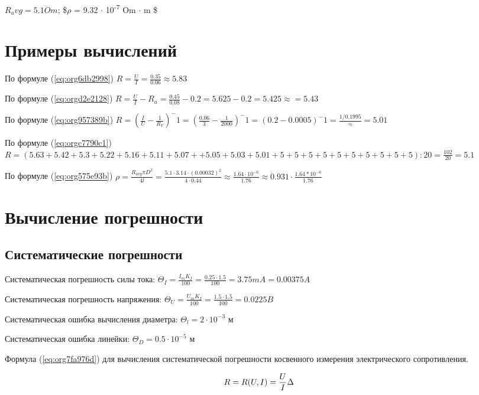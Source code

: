 \documentclass[14pt]{extarticle}
\begin{document}
\(R_avg = 5.1 Om\); \$\(\rho\) = 9.32 \(\cdot\) 10\textsuperscript{-7} Om \(\cdot\) m \$


\section{Примеры вычислений}
\label{sec:orgd89b211}

По формуле (\ref{eq:org6db2998}) \(R = \frac{U}{I} = \frac{0.35}{0.06} \approx 5.83\)

По формуле (\ref{eq:orgd2e2128}) \(R = \frac{U}{I} - R_a = \frac{0.45}{0.08} - 0.2 = 5.625 - 0.2 = 5.425 \approx = 5.43\)

По формуле (\ref{eq:org957389b}) \(R = (\frac{I}{U} - \frac{1}{R_V})^-1 = (\frac{0.06}{3} - \frac{1}{2000})^-1  = (0.2 - 0.0005)^-1 = \frac{1/0.1995} \approx = 5.01\)

По формуле (\ref{eq:orgc7790c1}) \(R = (5.63+5.42+5.3+5.22+5.16+5.11+5.07 + + 5.05+5.03+5.01+5+5+5+5+5+5+5+5+5+5) : 20 = \frac{102}{20} = 5.1\)

По формуле (\ref{eq:org575e93b}) \(\rho = \frac{R_{avg} \pi D^2}{4l} = \frac{5.1 \cdot 3.14 \cdot (0.00032)^2}{4 \cdot 0.44} \approx \frac{1.64 \cdot 10^{-6}}{1.76} \approx 0.931 \cdot \frac{1.64 * 10^{-6}}{1.76}\)


\section{Вычисление погрешности}
\label{sec:org918c2d1}

\subsection{Систематические погрешности}
\label{sec:org03ecdab}

Систематическая погрешность силы тока: \(\Theta_I = \frac{I_m K_I}{100} = \frac{0.25 \cdot 1.5}{100} = 3.75 mA = 0.00375 A\)

Систематическая погрешность напряжения: \(\Theta_U = \frac{U_m K_I}{100} = \frac{1.5 \cdot 1.5}{100} = 0.0225 B\)

Систематическая ошибка вычисления диаметра: \(\Theta_l = 2 \cdot 10^{-3}\) м

Систематическая ошибка линейки: \(\Theta_D = 0.5 \cdot 10^{-5}\) м

Формула (\ref{eq:org7fa976d}) для вычисления систематической погрешности косвенного измерения электрического
сопротивления.

\begin{equation}
\label{eq:org7fa976d}
R = R(U, I) = \frac{U}{I} \\
\Delta
\end{equation}
\end{document}
